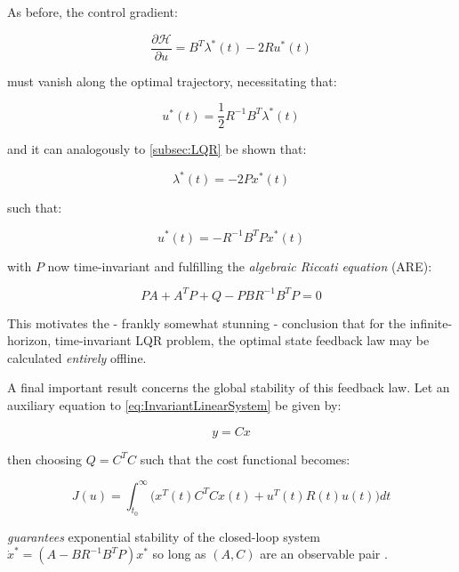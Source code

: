 As before, the control gradient:

\begin{equation}\label{eq:HamiltonianUGradientInfLQR}
	\frac{\partial \mathcal{H}}{\partial u} = B^T\lambda^*(t) - 2Ru^*(t)
\end{equation}

must vanish along the optimal trajectory, necessitating that:

\begin{equation}\label{eq:OptimalControlSequence}
	u^*(t) = \frac{1}{2} R^{-1}B^T\lambda^*(t)
\end{equation}

and it can analogously to \cref{subsec:LQR} be shown that:

\begin{equation}\label{eq:OptimalCostateSequenceInfLQR}
	\lambda^*(t) = -2Px^*(t)
\end{equation}

such that:

\begin{equation}\label{eq:InfLQRFeedbackLaw}
	u^*(t) = -R^{-1}B^TPx^*(t)
\end{equation}

with $P$ now time-invariant and fulfilling the \textit{algebraic Riccati equation} (ARE):

\begin{equation}\label{eq:ARE}
	 PA + A^TP + Q - PBR^{-1}B^TP = 0
\end{equation}

This motivates the - frankly somewhat stunning - conclusion that for the infinite-horizon, time-invariant LQR problem, the optimal state feedback law may be calculated \textit{entirely} offline.

A final important result concerns the global stability of this feedback law. Let an auxiliary equation to \cref{eq:InvariantLinearSystem} be given by:

\begin{equation}\label{eq:OutputEquation}
	y = Cx
\end{equation}

then choosing $Q = C^TC$ such that the cost functional becomes:

\begin{equation}\label{eq:ExpoStableLagrangeProblem}
	J(u) = \int_{t_0}^{\infty} \big(x^T(t)C^TCx(t) + u^T(t)R(t)u(t)\big)dt
\end{equation} 

\textit{guarantees} exponential stability of the closed-loop system $\dot{x}^* = (A-BR^{-1}B^TP)x^*$ so long as $(A,C)$ are an observable pair \cite{Liberzon2012}.

